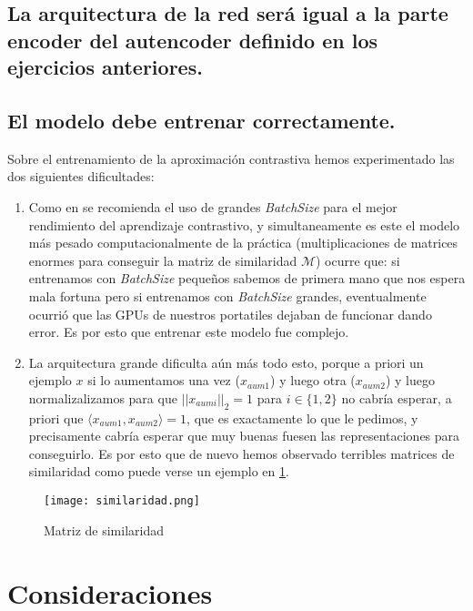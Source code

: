 \documentclass{article}
\begin{document}
\subsection{La arquitectura de la red será igual a la parte encoder del autencoder definido en los ejercicios anteriores.} 
\subsection{El modelo debe entrenar correctamente.}

Sobre el entrenamiento de la aproximación contrastiva hemos experimentado las dos siguientes dificultades:
\begin{enumerate}
    \item Como en \cite{chen2020simple} se recomienda el uso de grandes \emph{BatchSize} para el mejor rendimiento del aprendizaje contrastivo, y simultaneamente es este el modelo más pesado computacionalmente de la práctica (multiplicaciones de matrices enormes para conseguir la matriz de similaridad $\mathcal{M}$) ocurre que: si entrenamos con \emph{BatchSize} pequeños sabemos de primera mano que nos espera mala fortuna pero si entrenamos con \emph{BatchSize} grandes, eventualmente ocurrió que las GPUs de nuestros portatiles dejaban de funcionar dando error. Es por esto que entrenar este modelo fue complejo. 
    \item La arquitectura grande dificulta aún más todo esto, porque a priori un ejemplo $x$ si lo aumentamos una vez ($x_{aum1}$) y luego otra ($x_{aum2}$) y luego normalizalizamos para que $||x_{aumi}||_2 = 1$ para $i \in \{1,2\}$ no cabría esperar, a priori que $\langle x_{aum1}, x_{aum2}\rangle = 1$, que es exactamente lo que le pedimos, y precisamente cabría esperar que muy buenas fuesen las representaciones para conseguirlo. Es por esto que de nuevo hemos observado terribles matrices de similaridad como puede verse un ejemplo en \ref{fig:matriz}.
\end{enumerate}


\begin{figure}[h]
    \centering
    \texttt{[image: similaridad.png]}
    \caption{Matriz de similaridad}
    \label{fig:matriz}
\end{figure}

\section{Consideraciones}
\end{document}
